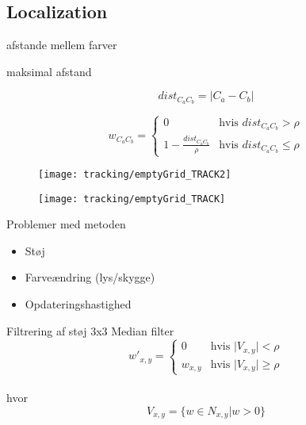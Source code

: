 \subsection{Localization}

\begin{frame}{afstande mellem farver}

\centering


\end{frame}

\begin{frame}{maksimal afstand}

$$dist_{C_aC_b} = \vert C_a - C_b \vert$$

$$w_{C_aC_b} = \begin{cases}
	0 &\text{hvis } dist_{C_aC_b} > \rho \\
	1 - \frac{dist_{C_aC_b}}{\rho} &\text{hvis } dist_{C_aC_b} \leq \rho
\end{cases}$$

\end{frame}

\begin{frame}

\begin{figure}
\centering
\texttt{[image: tracking/emptyGrid\_TRACK2]}

\texttt{[image: tracking/emptyGrid\_TRACK]}

\end{figure}
\end{frame}

\begin{frame}{Problemer med metoden}
\begin{itemize}
\item Støj
\item Farveændring (lys/skygge)
\item Opdateringshastighed
\end{itemize}

\end{frame}



\begin{frame}{Filtrering af støj}
3x3 Median filter \\


$$w'_{x,y} = \begin{cases}
	0 &\text{hvis } \vert V_{x,y} \vert < \rho \\
	w_{x,y} &\text{hvis } \vert V_{x,y} \vert \geq \rho
\end{cases}$$ \\
hvor $$V_{x,y} = \{w \in N_{x,y} \vert w > 0 \}$$
\end{frame}

